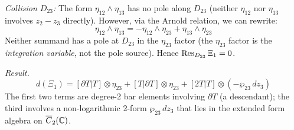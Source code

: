 \begin{computation}
\emph{Collision $D_{23}$:}
The form $\eta_{12} \wedge \eta_{13}$ has no pole along $D_{23}$
(neither $\eta_{12}$ nor $\eta_{13}$ involves $z_2 - z_3$ directly).
However, via the Arnold relation, we can rewrite:
\[
\eta_{12} \wedge \eta_{13}
= -\eta_{12} \wedge \eta_{23} + \eta_{13} \wedge \eta_{23}
\]
Neither summand has a pole at $D_{23}$ in the $\eta_{23}$ factor
(the $\eta_{23}$ factor is the \emph{integration variable},
not the pole source).  Hence $\operatorname{Res}_{D_{23}}\Xi_1 = 0$.

\emph{Result.}
\begin{equation}\label{eq:w3-dxi1}
d(\Xi_1) = [\partial T|T] \otimes \eta_{23}
+ [T|\partial T] \otimes \eta_{23}
+ [2T|T] \otimes (-\wp_{23}\,dz_3)
\end{equation}
The first two terms are degree-2 bar elements involving $\partial T$
(a descendant); the third involves a non-logarithmic 2-form
$\wp_{23}\,dz_3$ that lies in the extended form algebra
on $\overline{C}_2(\mathbb{C})$.
\end{computation}

